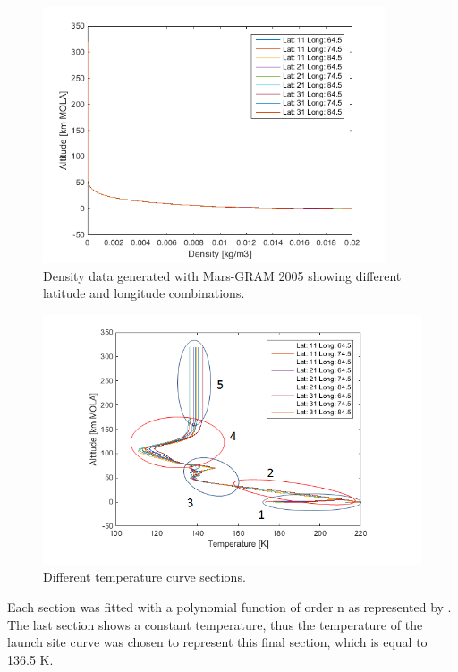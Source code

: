 \begin{figure}[H]
\centering
\includegraphics[width=0.9\textwidth]{figures/software/densityData.png}
\caption{Density data generated with Mars-\ac{GRAM} 2005 showing different latitude and longitude combinations.}
\label{fig:densityData}
\end{figure}


\begin{figure}[H]
\centering
\includegraphics[width=1.0\textwidth]{figures/software/temperatureDataSplit5.png}
\caption{Different temperature curve sections.}
\label{fig:temperatureDataSplit5}
\end{figure}

\noindent
Each section was fitted with a polynomial function of order n as represented by . The last section shows a constant temperature, thus the temperature of the launch site curve was chosen to represent this final section, which is equal to 136.5 K.

